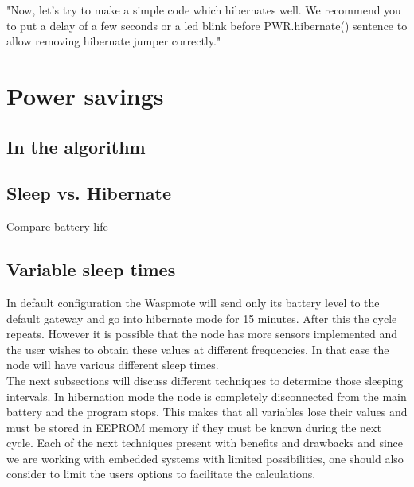"Now, let's try to make a simple code which hibernates well. We recommend you to put a delay of a few seconds or a led blink before PWR.hibernate() sentence to allow removing hibernate jumper correctly."

\section{Power savings}
\subsection{In the algorithm}
\subsection{Sleep vs. Hibernate}
Compare battery life
\subsection{Variable sleep times}
In default configuration the Waspmote will send only its battery level to the default gateway and go into hibernate mode for 15 minutes. After this the cycle repeats. However it is possible that the node has more sensors implemented and the user wishes to obtain these values at different frequencies. In that case the node will have various different sleep times. \\
The next subsections will discuss different techniques to determine those sleeping intervals. In hibernation mode the node is completely disconnected from the main battery and the program stops. This makes that all variables lose their values and must be stored in EEPROM memory if they must be known during the next cycle. Each of the next techniques present with benefits and drawbacks and since we are working with embedded systems with limited possibilities, one should also consider to limit the users options to facilitate the calculations.
